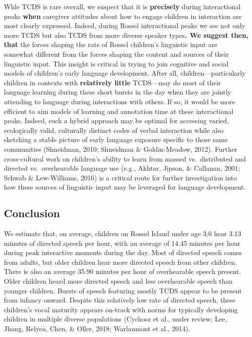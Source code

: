 \documentclass[,man,floatsintext]{apa6}
\begin{document}
Whle TCDS is rare overall, we suspect that it is \textbf{precisely}
during interactional peaks \textbf{when} caregiver attitudes about how
to engage children in interaction are most clearly expressed. Indeed,
during Rossel interactional peaks we see not only more TCDS but also
TCDS from more diverse speaker types\textbf{. We suggest then, that} the
forces shaping the rate of Rossel children's linguistic input are
somewhat different from the forces shaping the content and sources of
their linguistic input. This insight is critical in trying to join
cognitive and social models of children's early language development.
After all, children---particularly children in contexts with
\textbf{relatively little} TCDS---may do most of their language learning
during these short bursts in the day when they are jointly attending to
language during interactions with others. If so, it would be more
efficient to aim models of learning and annotation time at these
interactional peaks. Indeed, such a hybrid approach may be optimal for
accessing varied, ecologically valid, culturally distinct codes of
verbal interaction while also sketching a stable picture of early
language exposure specific to those same communities (Shneidman, 2010;
Shneidman \& Goldin-Meadow, 2012). Further cross-cultural work on
children's ability to learn from massed vs.~distributed and directed
vs.~overhearable language use (e.g., Akhtar, Jipson, \& Callanan, 2001;
Schwab \& Lew-Williams, 2016) is a critical route for further
investigation into how these sources of linguistic input may be
leveraged for language development.

\subsection{Conclusion}\label{disc-conclusion}

We estimate that, on average, children on Rossel Island under age 3;0
hear 3.13 minutes of directed speech per hour, with an average of 14.45
minutes per hour during peak interactive moments during the day. Most of
directed speech comes from adults, but older children hear more directed
speech from other children. There is also an average 35.90 minutes per
hour of overhearable speech present. Older children heard more directed
speech and less overhearable speech than younger children. Bursts of
speech featuring mostly TCDS appear to be present from infancy onward.
Despite this relatively low rate of directed speech, these children's
vocal maturity appears on-track with norms for typically developing
children in multiple diverse populations (Cychosz et al., under review;
Lee, Jhang, Relyea, Chen, \& Oller, 2018; Warlaumont et al., 2014).
\end{document}
